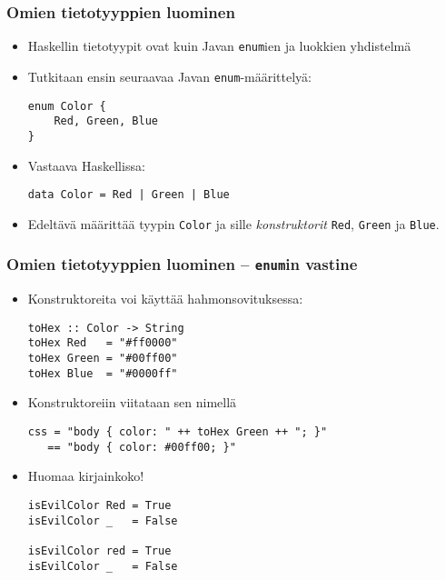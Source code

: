\documentclass{beamer}
\begin{document}
\begin{frame}[fragile]
\frametitle{Omien tietotyyppien luominen}
\begin{itemize}
\item{Haskellin tietotyypit ovat kuin Javan \texttt{enum}ien ja luokkien yhdistelmä}
\item{Tutkitaan ensin seuraavaa Javan \texttt{enum}-määrittelyä:}
\begin{verbatim}
enum Color {
    Red, Green, Blue
}
\end{verbatim}
\item{Vastaava Haskellissa:}
\begin{verbatim}
data Color = Red | Green | Blue
\end{verbatim}
\item{Edeltävä määrittää tyypin \texttt{Color} ja sille \emph{konstruktorit} \texttt{Red}, \texttt{Green} ja \texttt{Blue}.}
\end{itemize}
\end{frame}

\begin{frame}[fragile]
\frametitle{Omien tietotyyppien luominen -- \texttt{enum}in vastine}
\begin{itemize}

\item{Konstruktoreita voi käyttää hahmonsovituksessa:}
\begin{verbatim}
toHex :: Color -> String
toHex Red   = "#ff0000"
toHex Green = "#00ff00"
toHex Blue  = "#0000ff"
\end{verbatim}
\item{Konstruktoreiin viitataan sen nimellä}
\begin{verbatim}
css = "body { color: " ++ toHex Green ++ "; }"
   == "body { color: #00ff00; }"
\end{verbatim}
\item{Huomaa kirjainkoko!}
\begin{verbatim}
isEvilColor Red = True
isEvilColor _   = False

isEvilColor red = True
isEvilColor _   = False
\end{verbatim}

\end{itemize}
\end{frame}
\end{document}
